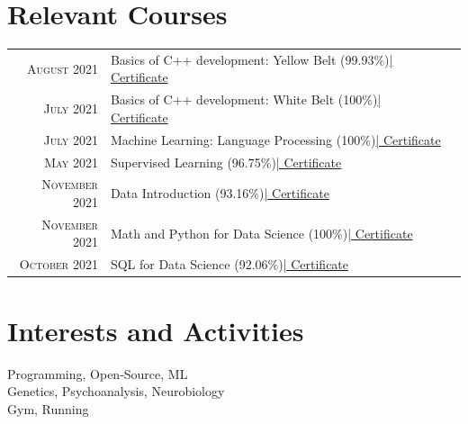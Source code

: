 \documentclass[a4paper,10pt]{article} %
\begin{document}
\section{Relevant Courses}
\begin{tabular}{rp{11cm}r}
    \textsc{August 2021} & Basics of C++ development: Yellow Belt \footnotesize(99.93\%)\normalsize\href{https://coursera.org/share/bd93be1044642b0f76be5859fbf1b96f}{\hfill | \footnotesize Certificate}\\
    \textsc{July 2021} &  Basics of C++ development: White Belt \footnotesize(100\%)\normalsize\href{https://coursera.org/share/f696a9c66143059a301f9f1e5d2bcca8}{\hfill | \footnotesize Certificate}\\
    \textsc{July 2021} &  Machine Learning: Language Processing \footnotesize(100\%)\normalsize\href{https://coursera.org/share/f91409b5a5184193be1017168afb7952}{\hfill | \footnotesize Certificate}\\
    \textsc{May 2021} & Supervised Learning \footnotesize(96.75\%)\normalsize\href{https://coursera.org/share/c877829114f8b67d7cc8a44057f4e571}{\hfill | \footnotesize Certificate}\\
    \textsc{November 2021} & Data Introduction \footnotesize(93.16\%)\normalsize\href{https://coursera.org/share/bd93be1044642b0f76be5859fbf1b96f}{\hfill | \footnotesize Certificate}\\
    \textsc{November 2021} & Math and Python for Data Science \footnotesize(100\%)\normalsize\href{https://coursera.org/share/b5ca152259931c53eb6cc4fff4203582}{\hfill | \footnotesize Certificate}\\
    \textsc{October 2021} & SQL for Data Science \footnotesize(92.06\%)\normalsize\href{https://coursera.org/share/8cf7fb85c6eed6291d92f67fcede0d92}{\hfill | \footnotesize Certificate}
\end{tabular}



\section{Interests and Activities}

Programming, Open-Source, ML\\
Genetics, Psychoanalysis, Neurobiology\\
Gym, Running
\end{document}
